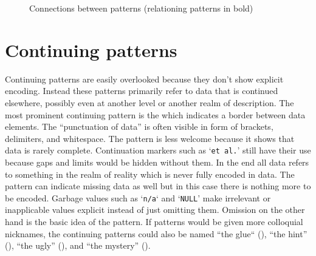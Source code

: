 \vfill
\begin{figure}[h]
\centering
{}
\caption{Connections between patterns (relationing patterns in bold)}
\label{fig:relpatterns}
\end{figure}
\vfill

\clearpage


\clearpage
\section{Continuing patterns}
\label{sec:continuing-patterns}

Continuing patterns are easily overlooked because they don't show explicit
encoding. Instead these patterns primarily refer to data that is continued
elsewhere, possibly even at another level or another realm of description. The
most prominent continuing pattern is the  which indicates a
border between data elements. The ``punctuation of data'' is often visible in
form of brackets, delimiters, and whitespace. The  pattern is
less welcome because it shows that data is rarely complete. Continuation
markers such as `\verb|et al.|' still have their use because gaps and limits
would be hidden without them. In the end all data refers to something in the
realm of reality which is never fully encoded in data. The 
pattern can indicate missing data as well but in this case there is nothing
more to be encoded. Garbage values such as `\verb|n/a|` and `\verb|NULL|' make
irrelevant or inapplicable values explicit instead of just omitting them.
Omission on the other hand is the basic idea of the  pattern.  If
patterns would be given more colloquial nicknames, the continuing patterns
could also be named ``the glue`` (), ``the hint''
(), ``the ugly'' (), and ``the mystery''
().


\clearpage
